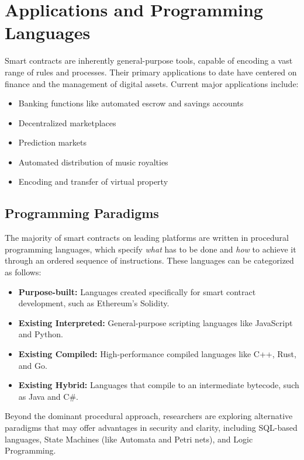 \documentclass{scrbook}
\begin{document}
\chapter{Applications and Programming Languages}

Smart contracts are inherently general-purpose tools, capable of encoding a vast range of rules and processes. Their primary applications to date have centered on finance and the management of digital assets. Current major applications include:

\begin{itemize}
    \item Banking functions like automated escrow and savings accounts
    \item Decentralized marketplaces
    \item Prediction markets
    \item Automated distribution of music royalties
    \item Encoding and transfer of virtual property
\end{itemize}

\section{Programming Paradigms}

The majority of smart contracts on leading platforms are written in procedural programming languages, which specify \textit{what} has to be done and \textit{how} to achieve it through an ordered sequence of instructions. These languages can be categorized as follows:

\begin{itemize}
    \item \textbf{Purpose-built:} Languages created specifically for smart contract development, such as Ethereum's Solidity.
    \item \textbf{Existing Interpreted:} General-purpose scripting languages like JavaScript and Python.
    \item \textbf{Existing Compiled:} High-performance compiled languages like C++, Rust, and Go.
    \item \textbf{Existing Hybrid:} Languages that compile to an intermediate bytecode, such as Java and C\#.
\end{itemize}

Beyond the dominant procedural approach, researchers are exploring alternative paradigms that may offer advantages in security and clarity, including SQL-based languages, State Machines (like Automata and Petri nets), and Logic Programming.
\end{document}
